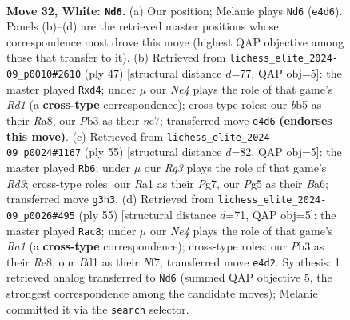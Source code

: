 \documentclass[11pt]{article}
\begin{document}
\clearpage

\begin{figure}[p]\centering
\begin{subfigure}{0.46\textwidth}\centering
\resizebox{\linewidth}{!}{%
\newchessgame
\chessboard[
  setfen={r5k1/4rppp/nn6/pb2p1P1/4N3/1P2P1R1/P5PP/RN1B3K w - - 2 32},
  showmover=false,
  pgfstyle=straightmove, color=movearrow, markmove={e4-d6}
]}
\caption{}
\end{subfigure}\hfill
\begin{subfigure}{0.46\textwidth}\centering
\resizebox{\linewidth}{!}{%
\newchessgame
\chessboard[
  setfen={r2r4/p3Npkp/1p2pp2/1B5n/3P4/6P1/P4P1P/R1R3K1 b - - 0 24},
  showmover=false,
  pgfstyle=straightmove, color=movearrow, markmove={d8-d4}
]}
\caption{}
\end{subfigure}
\\[4pt]
\begin{subfigure}{0.46\textwidth}\centering
\resizebox{\linewidth}{!}{%
\newchessgame
\chessboard[
  setfen={8/5kp1/b2rp1p1/2b2p2/P1Pn1P2/2R3P1/pB1N2BP/3K4 b - - 1 28},
  showmover=false,
  pgfstyle=straightmove, color=movearrow, markmove={d6-b6}
]}
\caption{}
\end{subfigure}\hfill
\begin{subfigure}{0.46\textwidth}\centering
\resizebox{\linewidth}{!}{%
\newchessgame
\chessboard[
  setfen={r3r1k1/1p3npp/5pn1/1P1Pp3/1B1pN3/1R1P2P1/5P1P/2R3K1 b - - 2 28},
  showmover=false,
  pgfstyle=straightmove, color=movearrow, markmove={a8-c8}
]}
\caption{}
\end{subfigure}
\caption{\textbf{Move 32, White: \texttt{Nd6}.} (a) Our position; Melanie plays \texttt{Nd6} (\texttt{e4d6}). Panels (b)--(d) are the retrieved master positions whose correspondence most drove this move (highest QAP objective among those that transfer to it). (b) Retrieved from \texttt{lichess\_elite\_2024-09\_p0010\#2610} (ply 47) [structural distance $d$=77, QAP obj=5]: the master played \texttt{Rxd4}; under $\mu$ our \emph{Ne4} plays the role of that game's \emph{Rd1} (a \textbf{cross-type} correspondence); cross-type roles: our \emph{b}b5 as their \emph{R}a8, our \emph{P}b3 as their \emph{n}e7; transferred move \texttt{e4d6} \textbf{(endorses this move)}. (c) Retrieved from \texttt{lichess\_elite\_2024-09\_p0024\#1167} (ply 55) [structural distance $d$=82, QAP obj=5]: the master played \texttt{Rb6}; under $\mu$ our \emph{Rg3} plays the role of that game's \emph{Rd3}; cross-type roles: our \emph{R}a1 as their \emph{P}g7, our \emph{P}g5 as their \emph{B}a6; transferred move \texttt{g3h3}. (d) Retrieved from \texttt{lichess\_elite\_2024-09\_p0026\#495} (ply 55) [structural distance $d$=71, QAP obj=5]: the master played \texttt{Rac8}; under $\mu$ our \emph{Ne4} plays the role of that game's \emph{Ra1} (a \textbf{cross-type} correspondence); cross-type roles: our \emph{P}b3 as their \emph{R}e8, our \emph{B}d1 as their \emph{N}f7; transferred move \texttt{e4d2}. Synthesis: 1 retrieved analog transferred to \texttt{Nd6} (summed QAP objective 5, the strongest correspondence among the candidate moves); Melanie committed it via the \texttt{search} selector.}
\label{fig:thought-m62}
\end{figure}
\end{document}
